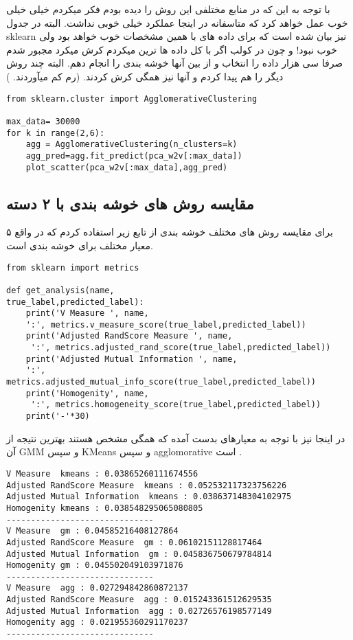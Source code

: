 \documentclass{article}[12pt]
\begin{document}
با توجه به این که در منابع مختلفی این روش را دیده بودم فکر میکردم خیلی خیلی خوب عمل خواهد کرد که متاسفانه در اینجا عملکرد خیلی خوبی نداشت. البته در جدول sklearn نیز بیان شده است که برای داده های با همین مشخصات خوب خواهد بود ولی خوب نبود! 
و چون در کولب اگر با کل داده ها ترین میکردم کرش میکرد مجبور شدم صرفا سی هزار داده را انتخاب و از بین آنها خوشه بندی را انجام دهم. البته چند روش دیگر را هم پیدا کردم و آنها نیز همگی کرش کردند. (رم کم میآوردند. )

\begin{verbatim}
from sklearn.cluster import AgglomerativeClustering

max_data= 30000
for k in range(2,6):
    agg = AgglomerativeClustering(n_clusters=k)
    agg_pred=agg.fit_predict(pca_w2v[:max_data])
    plot_scatter(pca_w2v[:max_data],agg_pred)
\end{verbatim}

\subsection{مقایسه روش های خوشه بندی با ۲ دسته}
برای مقایسه روش های مختلف خوشه بندی از تابع زیر استفاده کردم که در واقع ۵ معیار مختلف برای خوشه بندی است. 
\begin{verbatim}
from sklearn import metrics

def get_analysis(name,
true_label,predicted_label):
    print('V Measure ', name,
    ':', metrics.v_measure_score(true_label,predicted_label))
    print('Adjusted RandScore Measure ', name,
     ':', metrics.adjusted_rand_score(true_label,predicted_label))
    print('Adjusted Mutual Information ', name, 
    ':', metrics.adjusted_mutual_info_score(true_label,predicted_label))
    print('Homogenity', name,
     ':', metrics.homogeneity_score(true_label,predicted_label))
    print('-'*30)
\end{verbatim}

در اینجا نیز با توجه به معیارهای بدست آمده که همگی مشخص هستند بهترین نتیجه از آن GMM و سپس KMeans و سپس 
agglomorative  
است . 

\begin{verbatim}
V Measure  kmeans : 0.03865260111674556
Adjusted RandScore Measure  kmeans : 0.052532117323756226
Adjusted Mutual Information  kmeans : 0.038637148304102975
Homogenity kmeans : 0.038548295065080805
------------------------------
V Measure  gm : 0.04585216408127864
Adjusted RandScore Measure  gm : 0.06102151128817464
Adjusted Mutual Information  gm : 0.045836750679784814
Homogenity gm : 0.045502049103971876
------------------------------
V Measure  agg : 0.027294842860872137
Adjusted RandScore Measure  agg : 0.015243361512629535
Adjusted Mutual Information  agg : 0.02726576198577149
Homogenity agg : 0.021955360291170237
------------------------------
\end{verbatim}
\end{document}
